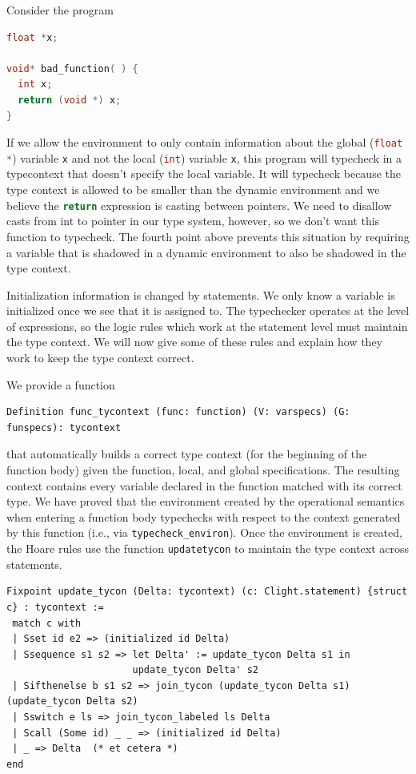 \documentclass{puthesis}
\begin{document}
Consider the program

\begin{lstlisting}[language = c]
float *x; 

void* bad_function( ) {
  int x;
  return (void *) x;
}
\end{lstlisting}

If we allow the environment to only contain information about the global
(\lstinline[language=c]|float *|) variable \lstinline|x| and not the
local (\lstinline[language=c]|int|) variable \lstinline|x|, this
program will typecheck in a typecontext that doesn't specify the local
variable. It will typecheck because the type context is allowed
to be smaller than the dynamic environment and we believe the
\lstinline[language=c]|return| expression is casting between pointers.
We need to disallow casts from int to pointer in our
type system, however, so we don't want this function to typecheck. The fourth
point above prevents this situation by requiring a variable that is shadowed in
a dynamic environment to also be shadowed in the type context.

Initialization information is changed by statements. We only know a variable is
initialized once we see that it is assigned to. The typechecker operates at
the level of expressions, so the logic rules which work at the
statement level must maintain the type context. We will now give some of these
rules and explain how they work to keep the type context correct.

We provide a function

\begin{lstlisting}
Definition func_tycontext (func: function) (V: varspecs) (G: funspecs): tycontext 
\end{lstlisting}
 
\noindent that automatically builds a correct type context (for the
beginning of the function body) given the function, local, and global
specifications. The resulting context contains every variable declared
in the function matched with its correct type. We have proved that the
environment created by the operational semantics when entering a
function body typechecks with respect to the context generated by this
function (i.e., via \lstinline|typecheck_environ|).  Once the
environment is created, the Hoare rules use the function
\lstinline|updatetycon| to maintain the type context across
statements.

\begin{lstlisting}
Fixpoint update_tycon (Delta: tycontext) (c: Clight.statement) {struct c} : tycontext :=
 match c with
 | Sset id e2 => (initialized id Delta)
 | Ssequence s1 s2 => let Delta' := update_tycon Delta s1 in
                      update_tycon Delta' s2
 | Sifthenelse b s1 s2 => join_tycon (update_tycon Delta s1) (update_tycon Delta s2)
 | Sswitch e ls => join_tycon_labeled ls Delta
 | Scall (Some id) _ _ => (initialized id Delta)
 | _ => Delta  (* et cetera *)
end
\end{lstlisting}
\end{document}
